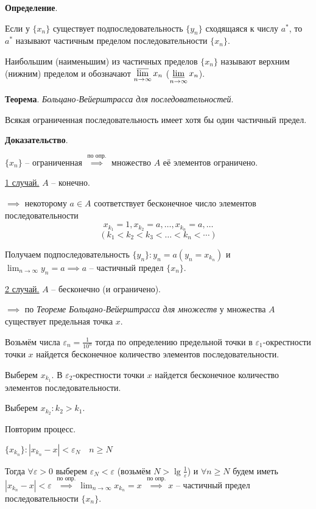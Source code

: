 \documentclass{article}
\newcommand{\bydef}{\stackrel{\text{по опр.}}{\implies}} %
\newcommand{\parspace}{\vspace{10pt}}
\newcommand{\dslim}{\displaystyle\lim}
\newcommand{\dslimn}{\dslim_{n \to \infty}}
\begin{document}
\pagebreak

\textbf{Определение}.

Если у $\{x_n\}$ существует подпоследовательность $\{y_n\}$ сходящаяся к числу $a^*$,
то $a^*$ называют частичным пределом последовательности $\{x_n\}$.

Наибольшим (наименьшим) из частичных пределов $\{x_n\}$ называют верхним (нижним) пределом
и обозначают $\displaystyle\varlimsup_{n \to \infty} x_n$
($\displaystyle\varliminf_{n \to \infty} x_n$).

\parspace

\textbf{Теорема}. \textit{Больцано-Вейерштрасса для последовательностей}.

Всякая ограниченная последовательность имеет хотя бы один частичный предел.

\textbf{Доказательство}.

$\{x_n\}$ -- ограниченная $\bydef$ множество $A$ её
элементов ограничено.

\underline{1 случай.} $A$ -- конечно.

$\implies$ некоторому $a \in A$ соответствует бесконечное число элементов последовательности 
\[x_{k_1} = 1, x_{k_2} = a, \dots, x_{k_n} = a, \dots\]
\[(k_1 < k_2 < k_3 < \dots < k_n < \cdots)\]

Получаем подпоследовательность $\{y_n\}: y_n = a (y_n = x_{k_n})$ и
$\dslimn y_n = a \implies a$ -- частичный предел $\{x_n\}$.

\underline{2 случай.} $A$ -- бесконечно (и ограничено).

$\implies$ по \textit{Теореме Больцано-Вейерштрасса для множеств} у множества $A$
существует предельная точка $x$.

Возьмём числа $\varepsilon_n = \frac{1}{10^n}$ тогда по определению предельной точки
в $\varepsilon_1$-окрестности точки $x$ найдется бесконечное количество элементов последовательности.

Выберем $x_{k_1}$. В $\varepsilon_2$-окрестности точки $x$ найдется бесконечное
количество элементов последовательности.

Выберем $x_{k_2}: k_2 > k_1$.

Повторим процесс.

$\{x_{k_n}\}: \left| x_{k_n} - x \right| < \varepsilon_N \quad n \ge N$

Тогда $\forall \varepsilon > 0$ выберем $\varepsilon_N < \varepsilon$
(возьмём $N > \lg \frac{1}{\varepsilon}$) и $\forall n \ge N$ будем иметь 
$\left| x_{k_n} - x \right| < \varepsilon$ 
$\bydef \dslimn x_{k_n} = x$
$\bydef x$ -- частичный предел последовательности $\{x_n\}$.
\end{document}
